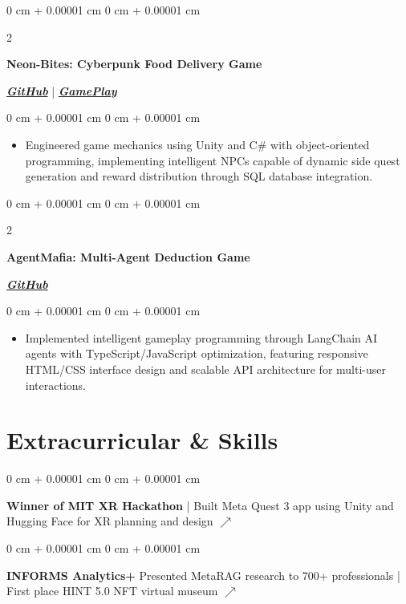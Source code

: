 \documentclass[10pt, letterpaper]{article}
\newenvironment{highlights}{
    \begin{itemize}[
        topsep=0.10 cm,
        parsep=0.10 cm,
        partopsep=0pt,
        itemsep=0pt,
        leftmargin=0 cm + 10pt
    ]
}{
    \end{itemize}
} %
\newenvironment{onecolentry}{
    \begin{adjustwidth}{
        0 cm + 0.00001 cm
    }{
        0 cm + 0.00001 cm
    }
}{
    \end{adjustwidth}
} %
\newenvironment{twocolentry}[2][]{
    \onecolentry
    \def\secondColumn{#2}
    \setcolumnwidth{\fill, 4.5 cm}
    \begin{paracol}{2}
}{
    \switchcolumn \raggedleft \secondColumn
    \end{paracol}
    \endonecolentry
} %
\begin{document}
\begin{twocolentry}{
  \href{https://github.com/bjank2/cs426_NeonBites}{\textbf{\textit{GitHub}}} | \href{https://drive.google.com/file/d/1YRlAXqU9cnuInfAALp8ZBFmzlFpd5cJL/view?usp=drive_link}{\textbf{\textit{GamePlay}}}
}
 \textbf{Neon-Bites: Cyberpunk Food Delivery Game}
\end{twocolentry}
\vspace{0.10 cm}
\begin{onecolentry}
 \begin{highlights}
\item Engineered game mechanics using Unity and C\# with object-oriented programming, implementing intelligent NPCs capable of dynamic side quest generation and reward distribution through SQL database integration.
 \end{highlights}
\end{onecolentry}

\vspace{0.1 cm}

\begin{twocolentry}{
\href{https://github.com/PranavMishra17/Mafia-Boardgame-via-Agents}{\textbf{\textit{GitHub}}}
      }
          \textbf{AgentMafia: Multi-Agent Deduction Game}
\end{twocolentry}
\vspace{0.10 cm}
\begin{onecolentry}
  \begin{highlights}
\item Implemented intelligent gameplay programming through LangChain AI agents with TypeScript/JavaScript optimization, featuring responsive HTML/CSS interface design and scalable API architecture for multi-user interactions.
  \end{highlights}
\end{onecolentry}


  \section{Extracurricular \& Skills}

\begin{onecolentry}
   \textbf{Winner of MIT XR Hackathon} | Built Meta Quest 3 app using Unity and Hugging Face for XR planning and design \href{https://codeberg.org/reality-hack-2024/TABLE_62}{\textbf{$\nearrow$}}
\end{onecolentry}
\vspace{0.15 cm}
\begin{onecolentry}
\textbf{INFORMS Analytics+}
   Presented MetaRAG research to 700+ professionals | First place HINT 5.0 NFT virtual museum \href{https://github.com/PranavMishra17/Nalleria}{\textbf{$\nearrow$}}
\end{onecolentry}
\end{document}
